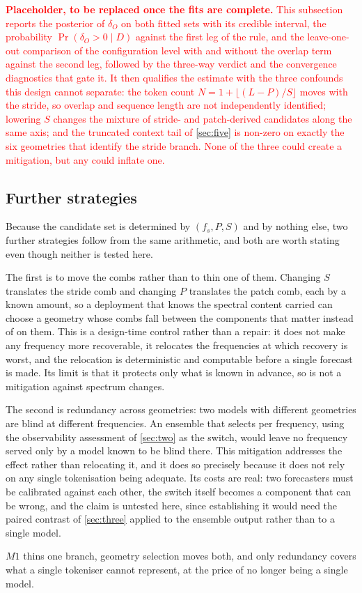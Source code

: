 \textcolor{red}{\textbf{Placeholder, to be replaced once the fits are complete.} This subsection reports the posterior of $\delta_O$ on both fitted sets with its credible interval, the probability $\Pr(\delta_O>0\mid D)$ against the first leg of the rule, and the leave-one-out comparison of the configuration level with and without the overlap term against the second leg, followed by the three-way verdict and the convergence diagnostics that gate it. It then qualifies the estimate with the three confounds this design cannot separate: the token count $N=1+\lfloor(L-P)/S\rfloor$ moves with the stride, so overlap and sequence length are not independently identified; lowering $S$ changes the mixture of stride- and patch-derived candidates along the same axis; and the truncated context tail of \autoref{sec:five} is non-zero on exactly the six geometries that identify the stride branch. None of the three could create a mitigation, but any could inflate one.}

\subsection*{Further strategies}

Because the candidate set is determined by $(f_s,P,S)$ and by nothing else, two further strategies follow from the same arithmetic, and both are worth stating even though neither is tested here.

The first is to move the combs rather than to thin one of them. Changing $S$ translates the stride comb and changing $P$ translates the patch comb, each by a known amount, so a deployment that knows the spectral content carried can choose a geometry whose combs fall between the components that matter instead of on them. This is a design-time control rather than a repair: it does not make any frequency more recoverable, it relocates the frequencies at which recovery is worst, and the relocation is deterministic and computable before a single forecast is made. Its limit is that it protects only what is known in advance, so is not a mitigation against spectrum changes.

The second is redundancy across geometries: two models with different geometries are blind at different frequencies. An ensemble that selects per frequency, using the observability assessment of \autoref{sec:two} as the switch, would leave no frequency served only by a model known to be blind there. This mitigation addresses the effect rather than relocating it, and it does so precisely because it does not rely on any single tokenisation being adequate. Its costs are real: two forecasters must be calibrated against each other, the switch itself becomes a component that can be wrong, and the claim is untested here, since establishing it would need the paired contrast of \autoref{sec:three} applied to the ensemble output rather than to a single model.

$M1$ thins one branch, geometry selection moves both, and only redundancy covers what a single tokeniser cannot represent, at the price of no longer being a single model.
